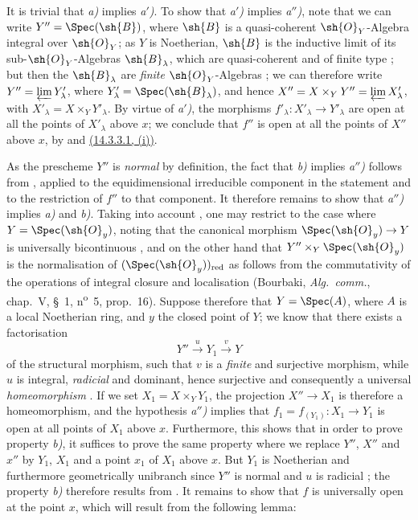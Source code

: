 It is trivial that \emph{a)} implies \emph{a$'$)}.
To show that \emph{a$'$)} implies \emph{a$''$)}, note that we can write $Y''=\Spec(\sh{B})$, where $\sh{B}$ is a quasi-coherent $\sh{O}_Y$-Algebra integral over $\sh{O}_Y$; as $Y$ is Noetherian, $\sh{B}$ is the inductive limit of its sub-$\sh{O}_Y$-Algebras $\sh{B}_\lambda$, which are quasi-coherent and of finite type ; but then the $\sh{B}_\lambda$ are \emph{finite} $\sh{O}_Y$-Algebras ; we can therefore write $Y''=\varprojlim Y'_\lambda$, where $Y'_\lambda=\Spec(\sh{B}_\lambda)$, and hence $X''=X\times_Y Y''=\varprojlim X'_\lambda$, with $X'_\lambda=X\times_Y Y'_\lambda$.
By virtue of \emph{a$'$)}, the morphisms $f'_\lambda:X'_\lambda\to Y'_\lambda$ are open at all the points of $X'_\lambda$ above $x$; we conclude that $f''$ is open at all the points of $X''$ above $x$, by  and \hyperref[IV.14.3.3.1]{(14.3.3.1, (i))}.

As the prescheme $Y''$ is \emph{normal} by definition, the fact that \emph{b)} implies \emph{a$''$)} follows from , applied to the equidimensional irreducible component in the statement and to the restriction of $f''$ to that component.
It therefore remains to show that \emph{a$''$)} implies \emph{a)} and \emph{b)}.
Taking into account , one may restrict to the case where $Y=\Spec(\sh{O}_y)$, noting that the canonical morphism $\Spec(\sh{O}_y)\to Y$ is universally bicontinuous , and on the other hand that $Y''\times_Y\Spec(\sh{O}_y)$ is the normalisation of $(\Spec(\sh{O}_y))_{\mathrm{red}}$ as follows from the commutativity of the operations of integral closure and localisation (Bourbaki, \emph{Alg.\ comm.}, chap.~V, \S~1, n\textsuperscript{o}~5, prop.~16).
Suppose therefore that $Y=\Spec(A)$, where $A$ is a local Noetherian ring, and $y$ the closed point of $Y$; we know  that there exists a factorisation
\[
  Y'' \xrightarrow{u} Y_1 \xrightarrow{v} Y
\]
of the structural morphism, such that $v$ is a \emph{finite} and surjective morphism, while $u$ is integral, \emph{radicial} and dominant, hence surjective  and consequently a universal \emph{homeomorphism} .
If we set $X_1=X\times_Y Y_1$, the projection $X''\to X_1$ is therefore a homeomorphism, and the hypothesis \emph{a$''$)} implies that $f_1=f_{(Y_1)}:X_1\to Y_1$ is open at all points of $X_1$ above $x$.
Furthermore, this shows that in order to prove property \emph{b)}, it suffices to prove the same property where we replace $Y''$, $X''$ and $x''$ by $Y_1$, $X_1$ and a point $x_1$ of $X_1$ above $x$.
But $Y_1$ is Noetherian and furthermore geometrically unibranch since $Y''$ is normal and $u$ is radicial ; the property \emph{b)} therefore results from .
It remains to show that $f$ is universally open at the point $x$, which will result from the following lemma:


